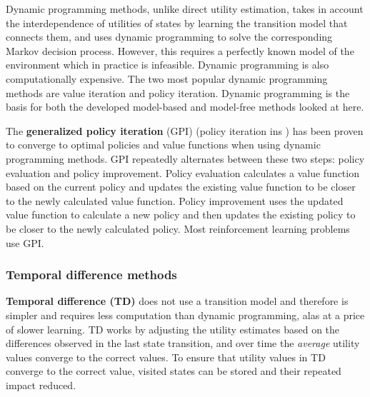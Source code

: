 Dynamic programming methods, unlike direct utility estimation, takes in
account the interdependence of utilities of states by learning the transition
model that connects them, and uses dynamic programming to solve the
corresponding Markov decision process. However, this requires a perfectly known
model of the environment which in practice is infeasible. Dynamic programming
is also computationally expensive. The two most popular dynamic programming
methods are value iteration and policy iteration. Dynamic programming is the
basis for both the developed model-based and model-free methods looked at here.
\parencite{Sutton1998ai+reinforcement}

The \textbf{generalized policy iteration} (GPI) (policy iteration ins
\textcite{Russell2010ai+modern}) has been proven to converge to optimal
policies and value functions when using dynamic programming methods. GPI
repeatedly alternates between these two steps: policy evaluation and policy
improvement. Policy evaluation calculates a value function based on the current
policy and updates the existing value function to be closer to the newly
calculated value function. Policy improvement uses the updated value function
to calculate a new policy and then updates the existing policy to be closer to
the newly calculated policy. Most reinforcement learning problems use GPI. \parencite{Sutton1998ai+reinforcement}


\subsubsection{Temporal difference methods}
\label{sec:ai:temporal}

\textbf{Temporal difference (TD)} does not use a transition model and therefore
is simpler and requires less computation than dynamic programming, alas at a
price of slower learning. TD works by adjusting the utility estimates based on
the differences observed in the last state transition, and over time the
\textit{average} utility values converge to the correct values. To ensure that
utility values in TD converge to the correct value, visited states can be
stored and their repeated impact reduced. \parencite{Russell2010ai+modern}
